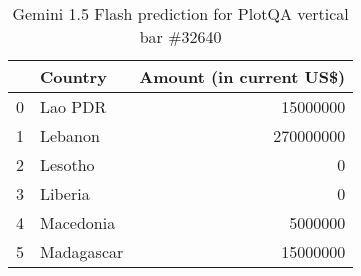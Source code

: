 \begin{table}
\begin{tabular}{llr}
\toprule
 & Country & Amount (in current US\$) \\
\midrule
0 & Lao PDR & 15000000 \\
1 & Lebanon & 270000000 \\
2 & Lesotho & 0 \\
3 & Liberia & 0 \\
4 & Macedonia & 5000000 \\
5 & Madagascar & 15000000 \\
\bottomrule
\end{tabular}
    \caption{Gemini 1.5 Flash prediction for PlotQA vertical bar \#32640}
    \label{tab:gemini-plotqa-vbar-32640}
\end{table}
